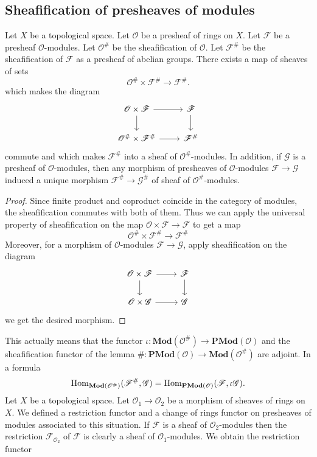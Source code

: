 \subsection{Sheafification of presheaves of modules}
\begin{proposition}\label{sheafification module}
Let $X$ be a topological space. Let $\mathscr{O}$ be a presheaf of rings on $X$. Let $\mathscr{F}$ be a presheaf $\mathscr{O}$-modules. Let $\mathscr{O}^{\#}$ be the sheafification of $\mathscr{O}$. Let $\mathscr{F}^{\#}$ be the sheafification of $\mathscr{F}$ as a presheaf of abelian groups. There exists a map of sheaves of sets
\[\mathscr{O}^{\#}\times\mathscr{F}^{\#}\to\mathscr{F}^{\#}.\]
which makes the diagram
\[\begin{tikzcd}
\mathscr{O}\times\mathscr{F}\ar[r]\ar[d]&\mathscr{F}\ar[d]\\
\mathscr{O}^{\#}\times\mathscr{F}^{\#}\ar[r]&\mathscr{F}^{\#}
\end{tikzcd}\]
commute and which makes $\mathscr{F}^{\#}$ into a sheaf of $\mathscr{O}^{\#}$-modules. In addition, if $\mathscr{G}$ is a presheaf of $\mathscr{O}$-modules, then any morphism of presheaves of $\mathscr{O}$-modules $\mathscr{F}\to\mathscr{G}$ induced a unique morphism $\mathscr{F}^{\#}\to\mathscr{G}^{\#}$ of sheaf of $\mathscr{O}^{\#}$-modules.
\end{proposition}
\begin{proof}
Since finite product and coproduct coincide in the category of modules, the sheafification commutes with both of them. Thus we can apply the universal property of sheafification on the map $\mathscr{O}\times\mathscr{F}\to\mathscr{F}$ to get a map
\[\mathscr{O}^{\#}\times\mathscr{F}^{\#}\to\mathscr{F}^{\#}\]
Moreover, for a morphism of $\mathscr{O}$-modules $\mathscr{F}\to\mathscr{G}$, apply sheafification on the diagram
\[\begin{tikzcd}
\mathscr{O}\times\mathscr{F}\ar[r]\ar[d]&\mathscr{F}\ar[d]\\
\mathscr{O}\times\mathscr{G}\ar[r]&\mathscr{G}
\end{tikzcd}\]
we get the desired morphism.
\end{proof}
This actually means that the functor $\iota:\mathbf{Mod}(\mathscr{O}^{\#})\to\mathbf{PMod}(\mathscr{O})$ and the sheafification functor of the lemma $\#:\mathbf{PMod}(\mathscr{O})\to\mathbf{Mod}(\mathscr{O}^{\#})$ are adjoint. In a formula
\[\mathrm{Hom}_{\mathbf{Mod}(\mathscr{O}^{\#})}(\mathscr{F}^{\#},\mathscr{G})=\mathrm{Hom}_{\mathbf{PMod}(\mathscr{O})}(\mathscr{F},\iota\mathscr{G}).\]
Let $X$ be a topological space. Let $\mathscr{O}_1\to\mathscr{O}_2$ be a morphism of sheaves of rings on $X$. We defined a restriction functor and a change of rings functor on presheaves of modules associated to this situation. If $\mathscr{F}$ is a sheaf of $\mathscr{O}_2$-modules then the restriction $\mathscr{F}_{\mathscr{O}_2}$ of $\mathscr{F}$ is clearly a sheaf of $\mathscr{O}_1$-modules. We obtain the restriction functor
